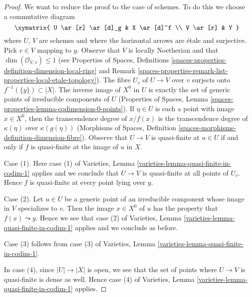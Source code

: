 \begin{proof}
We want to reduce the proof to the case of schemes. To do this we
choose a commutative diagram
$$
\xymatrix{
U \ar[r] \ar[d]_g & X \ar[d]^f \\
V \ar[r] & Y
}
$$
where $U$, $V$ are schemes and where the horizontal arrows are \'etale
and surjective. Pick $v \in V$ mapping to $y$. Observe that
$V$ is locally Noetherian and that $\dim(\mathcal{O}_{V, v}) \leq 1$
(see Properties of Spaces, Definitions
\ref{spaces-properties-definition-dimension-local-ring} and
Remark \ref{spaces-properties-remark-list-properties-local-etale-topology}).
The fibre $U_v$ of $U \to V$ over $v$ surjects onto
$f^{-1}(\{y\}) \subset |X|$. The inverse image of $X^0$ in $U$
is exactly the set of
generic points of irreducible components of $U$ (Properties of Spaces, Lemma
\ref{spaces-properties-lemma-codimension-0-points}).
If $\eta \in U$ is such a point with image $x \in X^0$, then
the transcendence degree of $x / f(x)$ is the transcendence
degree of $\kappa(\eta)$ over $\kappa(g(\eta))$
(Morphisms of Spaces, Definition
\ref{spaces-morphisms-definition-dimension-fibre}).
Observe that $U \to V$ is quasi-finite at $u \in U$ if and only if
$f$ is quasi-finite at the image of $u$ in $X$.

\medskip\noindent
Case (1). Here case (1) of
Varieties, Lemma \ref{varieties-lemma-quasi-finite-in-codim-1} applies
and we conclude that $U \to V$ is quasi-finite at all points of $U_v$.
Hence $f$ is quasi-finite at every point lying over $y$.

\medskip\noindent
Case (2). Let $u \in U$ be a generic point of an irreducible component
whose image in $V$ specializes to $v$. Then the image $x \in X^0$ of
$u$ has the property that $f(x) \leadsto y$. Hence we see that
case (2) of
Varieties, Lemma \ref{varieties-lemma-quasi-finite-in-codim-1} applies
and we conclude as before.

\medskip\noindent
Case (3) follows from case (3) of
Varieties, Lemma \ref{varieties-lemma-quasi-finite-in-codim-1}.

\medskip\noindent
In case (4), since $|U| \to |X|$ is open, we see that
the set of points where $U \to V$ is quasi-finite is dense as well.
Hence case (4) of
Varieties, Lemma \ref{varieties-lemma-quasi-finite-in-codim-1} applies.
\end{proof}

